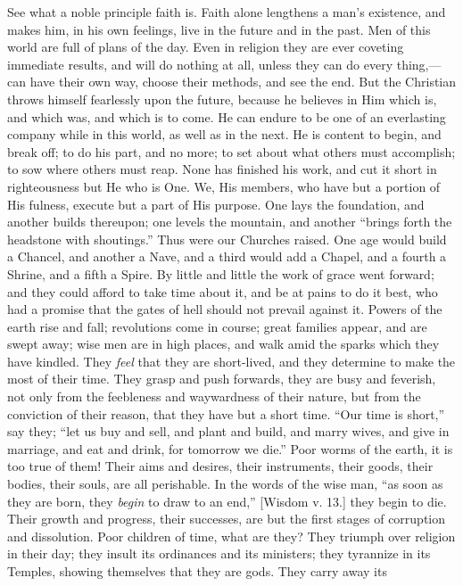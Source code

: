 See what a noble principle faith is. Faith alone lengthens a man's
existence, and makes him, in his own feelings, live in the future and
in the past. Men of this world are full of plans of the day. Even in
religion they are ever coveting immediate results, and will do nothing
at all, unless they can do every thing,—can have their own way,
choose their methods, and see the end. But the Christian throws
himself fearlessly upon the future, because he believes in Him which
is, and which was, and which is to come. He can endure to be one of an
everlasting company while in this world, as well as in the next. He is
content to begin, and break off; to do his part, and no more; to set
about what others must accomplish; to sow where others must reap. None
has finished his work, and cut it short in righteousness but He who is
One. We, His members, who have but a portion of His fulness, execute
but a part of His purpose. One lays the foundation, and another builds
thereupon; one levels the mountain, and another ``brings forth the
headstone with shoutings.'' Thus were our Churches raised. One age
would build a Chancel, and another a Nave, and a third would add a
Chapel, and a fourth a Shrine, and a fifth a Spire. By little and
little the work of grace went forward; and they could afford to take
time about it, and be at pains to do it best, who had a promise that
the gates of hell should not prevail against it. Powers of the earth
rise and fall; revolutions come in course; great families appear, and
are swept away; wise men are in high places, and walk amid the sparks
which they have kindled. They \emph{feel} that they are short-lived,
and they determine to make the most of their time. They grasp and push
forwards, they are busy and feverish, not only from the feebleness and
waywardness of their nature, but from the conviction of their reason,
that they have but a short time. ``Our time is short,'' say
they; ``let us buy and sell, and plant and build, and marry wives,
and give in marriage, and eat and drink, for tomorrow we die.''
Poor worms of the earth, it is too true of them! Their aims and
desires, their instruments, their goods, their bodies, their souls,
are all perishable. In the words of the wise man, ``as soon as
they are born, they \emph{begin} to draw to an end,'' [Wisdom v.
13.] they begin to die. Their growth and progress, their successes,
are but the first stages of corruption and dissolution. Poor children
of time, what are they? They triumph over religion in their day; they
insult its ordinances and its ministers; they tyrannize in its
Temples, showing themselves that they are gods. They carry away its
